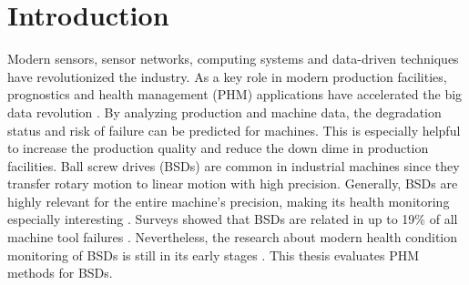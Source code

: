 
\chapter{Introduction}
Modern sensors, sensor networks, computing systems and data-driven techniques have revolutionized the industry. As a key role in modern production facilities, prognostics and health management (PHM) applications have accelerated the big data revolution \cite{ZHAO2019213}. By analyzing production and machine data, the degradation status and risk of failure can be predicted for machines. This is especially helpful to increase the production quality and reduce the down dime in production facilities. Ball screw drives (BSDs) are common in industrial machines since they transfer rotary motion to linear motion with high precision. Generally, BSDs are highly relevant for the entire machine’s precision, making its health monitoring especially interesting \cite{LiPin2018}. Surveys showed that BSDs are related in up to 19\% of all machine tool failures \cite{Denkena2021}. Nevertheless, the research about modern health condition monitoring of BSDs is still in its early stages \cite{LiPin2018}. This thesis evaluates PHM methods for BSDs.


